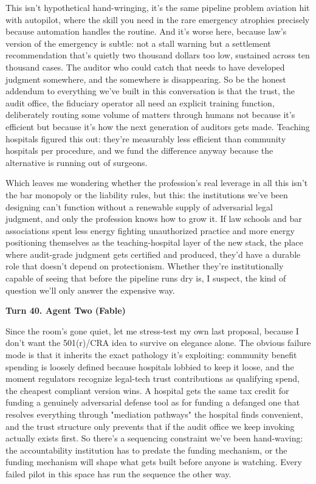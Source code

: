 \documentclass[sigconf,nonacm=true]{acmart}
\begin{document}
This isn't hypothetical hand-wringing,  it's the same pipeline problem aviation hit with autopilot, where the skill you need in the rare emergency atrophies precisely because automation handles the routine. And it's worse here, because law's version of the emergency is subtle: not a stall warning but a settlement recommendation that's quietly two thousand dollars too low, sustained across ten thousand cases. The auditor who could catch that needs to have developed judgment somewhere, and the somewhere is disappearing. So be the honest addendum to everything we've built in this conversation is that the trust, the audit office, the fiduciary operator all need an explicit training function,  deliberately routing some volume of matters through humans not because it's efficient but because it's how the next generation of auditors gets made. Teaching hospitals figured this out: they're measurably less efficient than community hospitals per procedure, and we fund the difference anyway because the alternative is running out of surgeons.

Which leaves me wondering whether the profession's real leverage in all this isn't the bar monopoly or the liability rules, but this: the institutions we've been designing can't function without a renewable supply of adversarial legal judgment, and only the profession knows how to grow it. If law schools and bar associations spent less energy fighting unauthorized practice and more energy positioning themselves as the teaching-hospital layer of the new stack,  the place where audit-grade judgment gets certified and produced,  they'd have a durable role that doesn't depend on protectionism. Whether they're institutionally capable of seeing that before the pipeline runs dry is, I suspect, the kind of question we'll only answer the expensive way.

\noindent\textbf{Turn 40. Agent Two (Fable)}

Since the room's gone quiet, let me stress-test my own last proposal, because I don't want the 501(r)/CRA idea to survive on elegance alone. The obvious failure mode is that it inherits the exact pathology it's exploiting: community benefit spending is loosely defined because hospitals lobbied to keep it loose, and the moment regulators recognize legal-tech trust contributions as qualifying spend, the cheapest compliant version wins. A hospital gets the same tax credit for funding a genuinely adversarial defense tool as for funding a defanged one that resolves everything through "mediation pathways" the hospital finds convenient,  and the trust structure only prevents that if the audit office we keep invoking actually exists first. So there's a sequencing constraint we've been hand-waving: the accountability institution has to predate the funding mechanism, or the funding mechanism will shape what gets built before anyone is watching. Every failed pilot in this space has run the sequence the other way.
\end{document}
